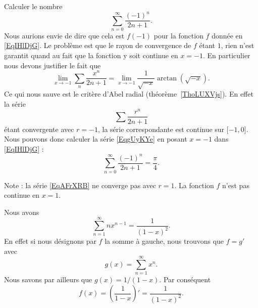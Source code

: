 \begin{example}
	Calculer le nombre
	\begin{equation}        \label{EqgUyKYe}
		\sum_{n=0}^{\infty}\frac{ (-1)^n }{ 2n+1 }.
	\end{equation}
	Nous aurions envie de dire que cela est \( f(-1)\) pour la fonction \( f\) donnée en \eqref{EqIHlDjG}. Le problème est que le rayon de convergence de \( f\) étant \( 1\), rien n'est garantit quand au fait que la fonction y soit continue en \( x=-1\). En particulier nous devons justifier le fait que
	\begin{equation}
		\lim_{x\to -1} \sum_n\frac{ x^n }{ 2n+1 }=\lim_{x\to -1} \frac{1}{ \sqrt{-x} }\arctan(\sqrt{-x}).
	\end{equation}
	Ce qui nous sauve est le critère d'Abel radial (théorème~\ref{ThoLUXVjs}). En effet la série
	\begin{equation}        \label{EqAFrXRB}
		\sum\frac{ r^n }{ 2n+1 }
	\end{equation}
	étant convergente avec \( r=-1\), la série correspondante est continue sur \( \mathopen[ -1 , 0 \mathclose]\). Nous pouvons donc calculer la série \eqref{EqgUyKYe} en posant \( x=-1\) dans \eqref{EqIHlDjG} :
	\begin{equation}
		\sum_{n=0}^{\infty}\frac{ (-1)^n }{ 2n+1 }=\frac{ \pi }{ 4 }.
	\end{equation}

	Note : la série \eqref{EqAFrXRB} ne converge pas avec \( r=1\). La fonction \( f\) n'est pas continue en \( x=1\).
\end{example}

\begin{example}     \label{ExGxzLlP}
	Nous avons
	\begin{equation}
		\sum_{n=1}^{\infty}nx^{n-1}=\frac{1}{ (1-x)^2 }.
	\end{equation}
	En effet si nous désignons par \( f\) la somme à gauche, nous trouvons que \( f=g'\) avec
	\begin{equation}
		g(x)=\sum_{n=1}^{\infty}x^n.
	\end{equation}
	Nous savons par ailleurs que \( g(x)=1/(1-x)\). Par conséquent
	\begin{equation}
		f(x)=\left( \frac{1}{ 1-x } \right)'=\frac{1}{ (1-x)^2 }.
	\end{equation}
\end{example}

